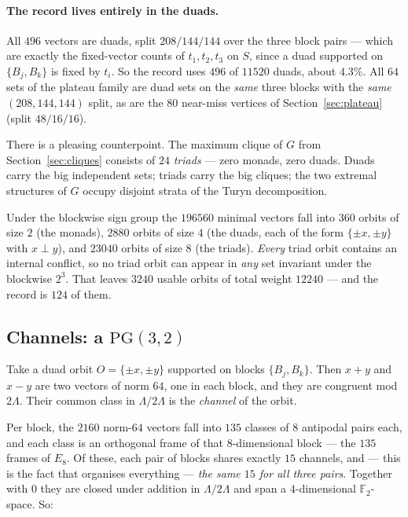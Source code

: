 \documentclass[10pt,a4paper]{article}
\newcommand{\Lam}{\Lambda}
\begin{document}
\paragraph{The record lives entirely in the duads.} All $496$ vectors are duads, split
$208 / 144 / 144$ over the three block pairs --- which are exactly the fixed-vector counts of
$t_1, t_2, t_3$ on $S$, since a duad supported on $\{B_j, B_k\}$ is fixed by $t_i$. So the record
uses $496$ of $11520$ duads, about $4.3\%$. All $64$ sets of the plateau family are duad sets on the
\emph{same} three blocks with the \emph{same} $(208,144,144)$ split, as are the $80$ near-miss
vertices of Section~\ref{sec:plateau} (split $48/16/16$).

There is a pleasing counterpoint. The maximum clique of $G$ from Section~\ref{sec:cliques} consists
of $24$ \emph{triads} --- zero monads, zero duads. Duads carry the big independent sets; triads
carry the big cliques; the two extremal structures of $G$ occupy disjoint strata of the Turyn
decomposition.

Under the blockwise sign group the $196560$ minimal vectors fall into $360$ orbits of size $2$ (the
monads), $2880$ orbits of size $4$ (the duads, each of the form $\{\pm x, \pm y\}$ with $x \perp y$),
and $23040$ orbits of size $8$ (the triads). \emph{Every} triad orbit contains an internal conflict,
so no triad orbit can appear in \emph{any} set invariant under the blockwise $2^3$. That leaves
$3240$ usable orbits of total weight $12240$ --- and the record is $124$ of them.

\subsection{Channels: a $\mathrm{PG}(3,2)$}

Take a duad orbit $O = \{\pm x, \pm y\}$ supported on blocks $\{B_j, B_k\}$. Then $x+y$ and $x-y$
are two vectors of norm $64$, one in each block, and they are congruent mod $2\Lam$. Their common
class in $\Lam / 2\Lam$ is the \emph{channel} of the orbit.

Per block, the $2160$ norm-$64$ vectors fall into $135$ classes of $8$ antipodal pairs each, and
each class is an orthogonal frame of that $8$-dimensional block --- the $135$ frames of $E_8$. Of
these, each pair of blocks shares exactly $15$ channels, and --- this is the fact that organises
everything --- \emph{the same $15$ for all three pairs}. Together with $0$ they are closed under
addition in $\Lam/2\Lam$ and span a $4$-dimensional $\mathbb{F}_2$-space. So:
\end{document}
